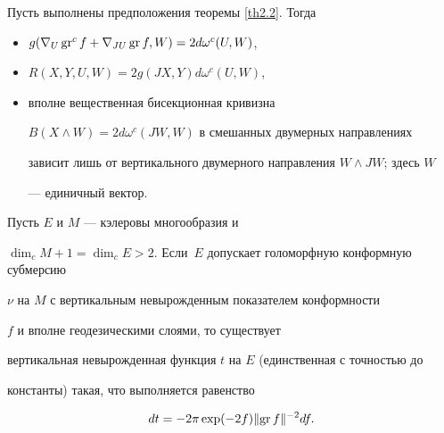 \begin{cors}\label{co2.3}


Пусть выполнены предположения теоремы \ref{th2.2}. Тогда


\begin{itemize}


\item[а)] $g(\nabla_U\operatorname{gr}^c f+\nabla_{JU}\operatorname{gr} f,W)=2d\omega^c(U,W)$,


\item[б)] $R(X,Y,U,W)=2g(JX,Y)d\omega^c(U,W)$,


\item[в)] вполне вещественная бисекционная кривизна


$B(X\land W)=2d\omega^c(JW,W)$ в смешанных двумерных направлениях


зависит лишь от вертикального двумерного направления $W\land JW$; здесь $W$


--- единичный вектор.


\end{itemize}


\end{cors}





\begin{lems}\label{lm2.4}


Пусть $E$ и $M$ --- кэлеровы многообразия и


$\dim_cM+1=\dim_cE>2$. Если~$E$ допускает голоморфную конформную субмерсию


$\nu$ на $M$ с вертикальным невырожденным показателем конформности


$f$ и вполне геодезическими слоями, то существует


вертикальная невырожденная функция $t$ на $E$ (единственная с точностью до


константы) такая, что выполняется равенство


\begin{equation}


\label{l23}


dt=-2\pi \exp (-2f)\Norma{\GR f}^{-2}df.


\end{equation}


\end{lems}





